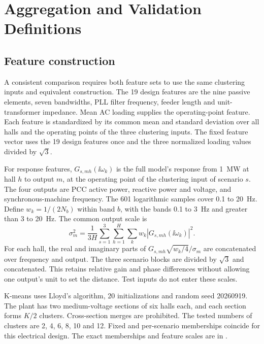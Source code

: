 \section{Aggregation and Validation Definitions}
\subsection{Feature construction}
A consistent comparison requires both feature sets to use the same clustering inputs and equivalent construction.
The 19 design features are the nine passive elements, seven bandwidths, PLL filter frequency, feeder length and unit-transformer impedance.
Mean AC loading supplies the operating-point feature.
Each feature is standardized by its common mean and standard deviation over all halls and the operating points of the three clustering inputs.
The fixed feature vector uses the 19 design features once and the three normalized loading values divided by $\sqrt{3}$.

For response features, $G_{s,mh}(\ii\omega_k)$ is the full model's response from 1~MW at hall $h$ to output $m$, at the operating point of the clustering input of scenario $s$.
The four outputs are PCC active power, reactive power and voltage, and synchronous-machine frequency.
The 601 logarithmic samples cover 0.1 to 20~Hz.
Define $w_k=1/(2N_b)$ within band $b$, with the bands 0.1 to 3~Hz and greater than 3 to 20~Hz.
The common output scale is
\begin{equation}
\sigma_m^2=\frac{1}{3H}\sum_{s=1}^{3}\sum_{h=1}^{H}\sum_k w_k|G_{s,mh}(\ii\omega_k)|^2.
\end{equation}
For each hall, the real and imaginary parts of $G_{s,mh}\sqrt{w_k/4}/\sigma_m$ are concatenated over frequency and output.
The three scenario blocks are divided by $\sqrt{3}$ and concatenated.
This retains relative gain and phase differences without allowing one output's unit to set the distance.
Test inputs do not enter these scales.

K-means uses Lloyd's algorithm, 20 initializations and random seed 20260919.
The plant has two medium-voltage sections of six halls each, and each section forms $K/2$ clusters.
Cross-section merges are prohibited.
The tested numbers of clusters are 2, 4, 6, 8, 10 and 12.
Fixed and per-scenario memberships coincide for this electrical design.
The exact memberships and feature scales are in .

